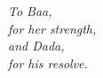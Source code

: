 
\begin{dedication} %

\large\emph{To Baa, \\ \indent for her strength, \\ and Dada, \\ \indent for his resolve.}

\end{dedication}

